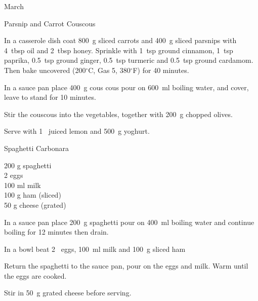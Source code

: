 \begin{menu}{March}
\begin{recipe}{2}{Parsnip and Carrot Couscous}
    \begin{instructions}
    \item 
        In a casserole dish coat
        800~g sliced carrots
        and
        400~g sliced parsnips
        with
        4~tbsp  oil
        and
        2~tbsp  honey.
        Sprinkle with
        1~tsp  ground cinnamon,
        1~tsp  paprika,
        0.5~tsp  ground ginger,
        0.5~tsp  turmeric
        and
        0.5~tsp  ground cardamom.        
        Then bake uncovered
        (200$^{\circ}$C, Gas 5, 380$^{\circ}$F)
        for 40 minutes.        
      \item 
      In a
      sauce pan 
      place
      400~g  cous cous
      pour on
      600~ml  boiling water,
      and cover, leave to stand for 10 minutes.
    \item 
        Stir the couscous into the vegetables,
        together with
        200~g chopped olives.
      \item 
        Serve with 1~ juiced lemon
        and
        500~g  yoghurt.
      
    \end{instructions}
    \end{recipe}%
  
    \begin{recipe}{1}{Spaghetti Carbonara}%
		\begin{ingredients}
		200 g spaghetti  \\
	2  eggs  \\
	100 ml milk  \\
	100 g ham (sliced) \\
	50 g cheese (grated) \\
	
		\end{ingredients}
	
    \begin{instructions}
    \item 
      In a
      sauce pan
      place
      200~g  spaghetti
      pour on
      400~ml  boiling water and continue boiling for 12 minutes then drain.
    \item 
        In a bowl beat
        2~  eggs,
        100~ml  milk
        and
        100~g sliced ham\item 
        Return the spaghetti to the sauce pan,
        pour on the eggs and milk.
        Warm until the eggs are cooked.
      \item 
        Stir in
        50~g grated cheese
      before serving.
      
    \end{instructions}
    \end{recipe}%
  
    \clearpage
    \end{menu}
	
